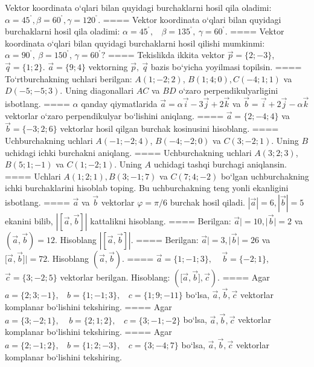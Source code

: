 Vektor koordinata o‘qlari bilan quyidagi burchaklarni hosil qila oladimi:
$\alpha = 45^{{^\circ}},\beta = 60^{{^\circ}},\gamma = 120^{{^\circ}}$.
====
Vektor koordinata o‘qlari bilan quyidagi burchaklarni hosil qila oladimi:
$\alpha = 45^{{^\circ}},\ \ \ \ \beta = 135^{{^\circ}},\ \gamma = 60^{{^\circ}}$.
====
Vektor koordinata o‘qlari bilan quyidagi burchaklarni hosil qilishi
mumkinmi: $\alpha = 90^{{^\circ}},\ \beta = 150^{{^\circ}}$,
$\gamma = 60^{{^\circ}}?$
====
Tekislikda ikkita vektor
$\overrightarrow{p} = \{ 2; - 3\}$, $\overrightarrow{q} = \{ 1;2\}$.
$\overrightarrow{a} = \{9;4\}$ vektorning
$\overrightarrow{p},\ \overrightarrow{q}$ bazis bo‘yicha yoyilmasi topilsin.
====
To‘rtburchakning uchlari berilgan:
$A (1; - 2;2) $, $B (1;4;0),C (- 4;1;1) $ va $D (- 5; -5;3) $. Uning diagonallari $AC$ va $BD$ o‘zaro
perpendikulyarligini isbotlang.
====
$\alpha$
qanday qiymatlarida 
$\overrightarrow{a} = \alpha\overrightarrow{i} - 3\overrightarrow{j} + 2\overrightarrow{k}$
va
$\overrightarrow{b} = \overrightarrow{i} + 2\overrightarrow{j} - \alpha\overrightarrow{k}$
vektorlar o‘zaro perpendikulyar bo‘lishini aniqlang.
====
$\overrightarrow{a} = \{ 2; - 4;4\}$ va $\overrightarrow{b} = \{ - 3;2;6\}$
vektorlar hosil qilgan burchak kosinusini hisoblang.
====
Uchburchakning uchlari
$A (- 1; - 2;4) $, $B (- 4; - 2;0) $ va $C (3; -2;1) $. Uning $B$ uchidagi
ichki burchakni aniqlang.
====
Uchburchakning uchlari
$A (3;2; 3) $, $B (5;1; - 1) $ va $C (1; -2;1) $. Uning $A$ uchidagi tashqi burchagi aniqlansin.
====
Uchlari $A (1;2;1), B (3;-1;7) $ va $C (7;4;-2) $ bo‘lgan uchburchakning
ichki burchaklarini hisoblab toping. Bu uchburchakning teng yonli ekanligini isbotlang.
====
$\overrightarrow{a}$ va $\overrightarrow{b}$ vektorlar
$\varphi = \pi/6$ burchak hosil qiladi.
$|\overrightarrow{a}| = 6,|\overrightarrow{b}| = 5$ ekanini bilib,
$\left| \left\lbrack \overrightarrow{a},\overrightarrow{b} \right\rbrack \right|$ kattalikni hisoblang.
====
Berilgan: $\overrightarrow{a}| = 10,|\overrightarrow{b}| = 2$ va
$\left(\overrightarrow{a},\overrightarrow{b} \right) = 12$. Hisoblang
$\left| \left\lbrack \overrightarrow{a},\overrightarrow{b} \right\rbrack \right|$.
====
Berilgan: $\overrightarrow{a}| = 3,|\overrightarrow{b}| = 26$ va
$\lbrack\overrightarrow{a},\overrightarrow{b}\rbrack| = 72$. Hisoblang
$\left(\overrightarrow{a},\overrightarrow{b} \right) $.
====
$\overrightarrow{a}
= \{ 1; - 1;3\}, \ \ \ \ \ \overrightarrow{b} = \{ - 2;1\}$, $\overrightarrow{c} = \{3; -2;5\}$ vektorlar berilgan. Hisoblang:
$ (\lbrack\overrightarrow{a},\overrightarrow{b}\rbrack,\overrightarrow{c}) $.
====
Agar \(a = \{ 2;3; - 1\}, \ \ \ \ b = \{ 1; - 1;3\}, \ \ \ \ c = \{ 1;9; - 11\}\) bo‘lsa, $\overrightarrow{a}, \overrightarrow{b}, \overrightarrow{c}$ vektorlar komplanar bo‘lishini tekshiring.
====
Agar \(a = \{ 3; - 2;1\},\ \ \ \ \ b = \{ 2;1;2\},\ \ \ \ c = \{ 3; - 1; - 2\}\) bo‘lsa, $\overrightarrow{a}, \overrightarrow{b}, \overrightarrow{c}$ vektorlar komplanar bo‘lishini tekshiring.
====
Agar \(a = \{ 2; - 1;2\}, \ \ \ \ b = \{ 1;2; - 3\}, \ \ \ \ c = \{ 3; - 4;7\}\) bo‘lsa, $\overrightarrow{a}, \overrightarrow{b}, \overrightarrow{c}$ vektorlar komplanar bo‘lishini tekshiring.